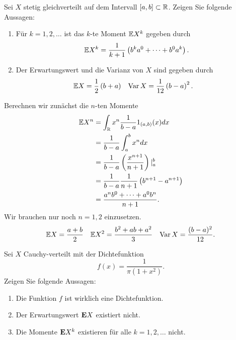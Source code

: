 Sei $X$ stetig gleichverteilt auf dem Intervall $\left[ a,b \right]\subset \mathbb R$.
Zeigen Sie folgende Aussagen: 
\begin{enumerate}
    \item Für $k=1,2,\dots$ ist das $k$-te Moment $\mathbb E X^{k}$ gegeben durch
        \begin{equation*}
            \mathbb E X^k = \frac{1}{k+1}\left( b^{k}a^0 + \cdots + b^{0}a^{k} \right).
        \end{equation*}
    \item Der Erwartungswert und die Varianz von $X$ sind gegeben durch
        \begin{align*}
            \mathbb E X    & = \frac{1}{2} \left( b+a \right) & 
            \operatorname{Var} X  & = \frac{1}{12} \left( b-a \right)^{2}.  
        \end{align*}
\end{enumerate}

\solution Berechnen wir zunächst die $n$-ten Momente
\begin{align*}
    \mathbb E X^n &= \int_{\mathbb R}^{} x^n \frac{1}{b-a} 1_{(a,b)}(x) dx \\
    &= \frac{1}{b-a} \int_{a}^{b} x^n dx \\
    &= \frac{1}{b-a} \left( \frac{x^{n+1}}{n+1} \right) |_{a}^{b} \\
    &= \frac{1}{b-a}\frac{1}{n+1} \left( b^{n+1}-a^{n+1} \right) \\
    &= \frac{a^n b^{0} +\cdots+ a^0 b^{n}}{n+1}.
\end{align*}
Wir brauchen nur noch $n=1,2$ einzusetzen.
\begin{align*}
    \mathbb E X &= \frac{a+b}{2} & \mathbb E X^2 &= \frac{b^2 + ab + a^2}{3} & 
    \operatorname{Var} X = \frac{(b-a)^2}{12}.
\end{align*}


Sei $X$ Cauchy-verteilt mit der Dichtefunktion
\begin{equation*}
    f(x) = \frac{1}{\pi (1+x^2)}.
\end{equation*}
Zeigen Sie folgende Aussagen:
\begin{enumerate}
    \item Die Funktion $f$ ist wirklich eine Dichtefunktion.
    \item Der Erwartungswert $\mathbf E X$ existiert nicht.
    \item Die Momente $\mathbf E X^k$ existieren für alle $k=1,2,\dots$ nicht.
\end{enumerate}

